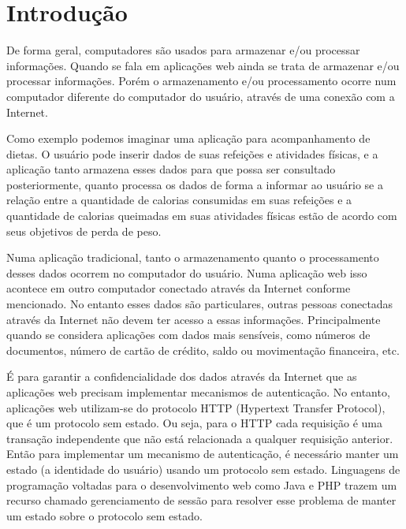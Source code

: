 




\chapter{Introdução}

De forma geral, computadores são usados para armazenar e/ou processar informações. Quando se fala em aplicações web ainda se trata de armazenar e/ou processar informações. Porém o armazenamento e/ou processamento ocorre num computador diferente do computador do usuário, através de uma conexão com a Internet.

Como exemplo podemos imaginar uma aplicação para acompanhamento de dietas. O usuário pode inserir dados de suas refeições e atividades físicas, e a aplicação tanto armazena esses dados para que possa ser consultado posteriormente, quanto processa os dados de forma a informar ao usuário se a relação entre a quantidade de calorias consumidas em suas refeições e a quantidade de calorias queimadas em suas atividades físicas estão de acordo com seus objetivos de perda de peso.

Numa aplicação tradicional, tanto o armazenamento quanto o processamento desses dados ocorrem no computador do usuário. Numa aplicação web isso acontece em outro computador conectado através da Internet conforme mencionado. No entanto esses dados são particulares, outras pessoas conectadas através da Internet não devem ter acesso a essas informações. Principalmente quando se considera aplicações com dados mais sensíveis, como números de documentos, número de cartão de crédito, saldo ou movimentação financeira, etc.

É para garantir a confidencialidade dos dados através da Internet que as aplicações web precisam implementar mecanismos de autenticação. No entanto, aplicações web utilizam-se do protocolo HTTP (Hypertext Transfer Protocol), que é um protocolo sem estado. Ou seja, para o HTTP cada requisição é uma transação independente que não está relacionada a qualquer requisição anterior. Então para implementar um mecanismo de autenticação, é necessário manter um estado (a identidade do usuário) usando um protocolo sem estado. Linguagens de programação voltadas para o desenvolvimento web como Java e PHP trazem um recurso chamado gerenciamento de sessão para resolver esse problema de manter um estado sobre o protocolo sem estado.

